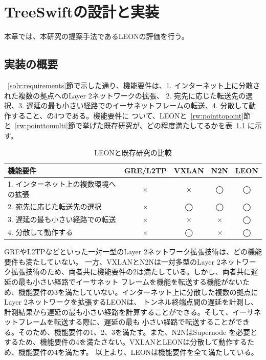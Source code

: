 \chapter{TreeSwiftの設計と実装}
\label{experiment}

本章では、本研究の提案手法であるLEONの評価を行う。

\section{実装の概要}
\label{applicationperformance}

~\ref{solv:requirements}節で示した通り、機能要件は、1. インターネット上に分散された複数の拠点へのLayer 2ネットワークの拡張、
2. 宛先に応じた転送先の選択、3. 遅延の最も小さい経路でのイーサネットフレームの転送、4. 分散して動作すること、の4つである。機能要件に
ついて、LEONと~\ref{rw:pointtopoint}節と~\ref{rw:pointtomulti}節で挙げた既存研究が、どの程度満たしてるかを表~\ref{table:relatedworksandleon}
に示す。

\begin{table}[h]
	\begin{center}
		\caption{LEONと既存研究の比較}
		\begin{tabular}{|l|c|c|c|c|}
			\hline
			機能要件 & GRE/L2TP & VXLAN & N2N & LEON \\
			\hline
			\hline
			1. インターネット上の複数環境への拡張 & × & × & ◯ & ◯ \\
			\hline
			2. 宛先に応じた転送先の選択 & × & ◯ & ◯ & ◯ \\
			\hline
			3. 遅延の最も小さい経路での転送 & × & × & × & ◯ \\
			\hline
			4. 分散して動作する & × & ◯ & × & ◯ \\
			\hline
		\end{tabular}
		\label{table:relatedworksandleon}
	\end{center}
\end{table}

GREやL2TPなどといった一対一型のLayer 2ネットワーク拡張技術は、どの機能要件も満たしていない。
一方、VXLANとN2Nは一対多型のLayer 2ネットワーク拡張技術のため、両者共に機能要件の2は満たしている。しかし、両者共に遅延の最も小さい経路でイーサネット
フレームを機能を転送する機能がないため、機能要件の3を満たしていない。インターネット上に分散した複数の拠点にLayer 2ネットワークを拡張するLEONは、
トンネル終端点間の遅延を計測し、計測結果から遅延の最も小さい経路を計算することができる。そして、イーサネットフレームを転送する際に、遅延の最も
小さい経路で転送することができる。そのため、機能要件の1、2、3を満たす。また、N2NはSupernode
を必要とするため、機能要件の4を満たさない。VXLANとLEONは分散して動作するため、機能要件の4を満たす。
以上より、LEONは機能要件を全て満たしている。

